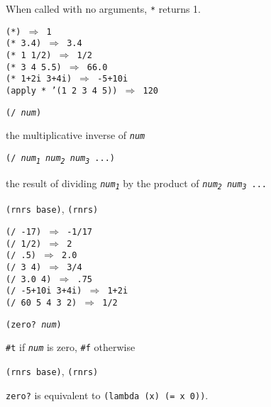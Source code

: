 When called with no arguments, \texttt{*} returns 1.


\begin{alltt}
(*) \(\Rightarrow\) 1
(* 3.4) \(\Rightarrow\) 3.4
(* 1 1/2) \(\Rightarrow\) 1/2
(* 3 4 5.5) \(\Rightarrow\) 66.0
(* 1+2i 3+4i) \(\Rightarrow\) -5+10i
(apply * '(1 2 3 4 5)) \(\Rightarrow\) 120
\end{alltt}

\begin{description}

\label{objects_s92}\item[procedure] \texttt{(/ \textit{num})}



\item[returns] the multiplicative inverse of \texttt{\textit{num}}


\item[procedure] \texttt{(/ \textit{num\textsubscript{1}} \textit{num\textsubscript{2}} \textit{num\textsubscript{3}} ...)}



\item[returns] the result of dividing \texttt{\textit{num\textsubscript{1}}} by the product of \texttt{\textit{num\textsubscript{2}} \textit{num\textsubscript{3}} ...}


\item[libraries] \texttt{(rnrs base)}, \texttt{(rnrs)}
\end{description}


\begin{alltt}
(/ -17) \(\Rightarrow\) -1/17
(/ 1/2) \(\Rightarrow\) 2
(/ .5) \(\Rightarrow\) 2.0
(/ 3 4) \(\Rightarrow\) 3/4
(/ 3.0 4) \(\Rightarrow\) .75
(/ -5+10i 3+4i) \(\Rightarrow\) 1+2i
(/ 60 5 4 3 2) \(\Rightarrow\) 1/2
\end{alltt}

\begin{description}

\label{objects_s93}\item[procedure] \texttt{(zero? \textit{num})}



\item[returns] \texttt{\#{}t} if \texttt{\textit{num}} is zero, \texttt{\#{}f} otherwise


\item[libraries] \texttt{(rnrs base)}, \texttt{(rnrs)}
\end{description}

\texttt{zero?} is equivalent to \texttt{(lambda (x) (= x 0))}.


